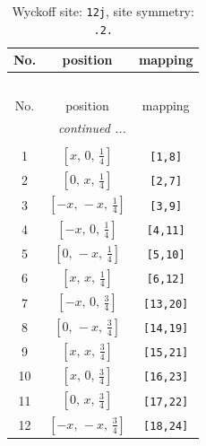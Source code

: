 \documentclass[fleqn,8pt]{jsarticle}
\begin{document}
\begin{longtable}{ccc}
\caption{Wyckoff site: {\tt 12j}, site symmetry: {\tt .2.}}
 \\
 \hline \hline
No. & position & mapping \\ \hline \endfirsthead

\multicolumn{2}{l}{\tablename\ \thetable{}} \\
 \hline \hline
No. & position & mapping \\ \hline \endhead

 \hline \hline
\multicolumn{2}{r}{\footnotesize\it continued ...} \\ \endfoot

 \hline \hline
\multicolumn{2}{r}{} \\ \endlastfoot

1 & $\left[ x,\, 0,\, \frac{1}{4} \right]$ & {\tt [1,8]} \\ \hline
2 & $\left[ 0,\, x,\, \frac{1}{4} \right]$ & {\tt [2,7]} \\ \hline
3 & $\left[ - x,\, - x,\, \frac{1}{4} \right]$ & {\tt [3,9]} \\ \hline
4 & $\left[ - x,\, 0,\, \frac{1}{4} \right]$ & {\tt [4,11]} \\ \hline
5 & $\left[ 0,\, - x,\, \frac{1}{4} \right]$ & {\tt [5,10]} \\ \hline
6 & $\left[ x,\, x,\, \frac{1}{4} \right]$ & {\tt [6,12]} \\ \hline
7 & $\left[ - x,\, 0,\, \frac{3}{4} \right]$ & {\tt [13,20]} \\ \hline
8 & $\left[ 0,\, - x,\, \frac{3}{4} \right]$ & {\tt [14,19]} \\ \hline
9 & $\left[ x,\, x,\, \frac{3}{4} \right]$ & {\tt [15,21]} \\ \hline
10 & $\left[ x,\, 0,\, \frac{3}{4} \right]$ & {\tt [16,23]} \\ \hline
11 & $\left[ 0,\, x,\, \frac{3}{4} \right]$ & {\tt [17,22]} \\ \hline
12 & $\left[ - x,\, - x,\, \frac{3}{4} \right]$ & {\tt [18,24]} \\
\end{longtable}
\renewcommand{\arraystretch}{1.2}
\end{document}
